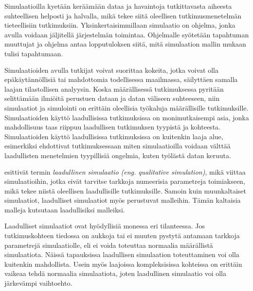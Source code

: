 \documentclass[utf8]{gradu3}
\begin{document}
Simulaatioilla kyetään keräämään dataa ja havaintoja tutkittavasta aiheesta suhteellisen helposti ja halvalla, mikä tekee siitä oleellisen tutkimusmenetelmän tieteellisiin tutkimuksiin. Yksinkertaisimmillaan simulaatio on ohjelma, jonka avulla voidaan jäljitellä järjestelmän toimintaa. Ohjelmalle syötetään tapahtuman muuttujat ja ohjelma antaa lopputuloksen siitä, mitä simulaation mallin mukaan tulisi tapahtumaan. 

Simulaatioiden avulla tutkijat voivat suorittaa kokeita, jotka voivat olla epäkäytännöllisiä tai mahdottomia todellisessa maailmassa, säilyttäen samalla laajan tilastollisen analyysin. Koska määrällisessä tutkimuksessa pyritään selittämään ilmiöitä perustuen dataan ja datan väliseen suhteeseen, niin simulaatiot ja simulointi on erittäin oleellisia työkaluja määrällisille tutkimuksille. 
Simulaatioiden käyttö laadullisissa tutkimuksissa on monimutkaisempi asia, 
jonka mahdollisuus taas riippuu laadullisen tutkimuksen tyypistä ja kohteesta. 
Simulaatioiden käyttö laadullisissa tutkimuksissa on kuitenkin laaja alue, 
esimerkiksi \textcite{eldabi2002quantitative} ehdottivat tutkimuksessaan miten simulaatioilla voidaan välttää laadullisten menetelmien tyypillisiä ongelmia, kuten työlästä datan keruuta. 

\textcite{kuipers1986qualitative} esittivät termin \textit{laadullinen simulaatio (eng. qualitative simulation)}, 
mikä viittaa simulaatioihin, jotka eivät tarvitse tarkkoja numeerisia parametreja toimiakseen, mikä tekee niistä oleellisen laadullisille tutkimuksille. 
Samoin kuin muunkaltaiset simulaatiot, laadulliset simulaatiot myös perustuvat malleihin.
Tämän kaltaisia malleja kutsutaan laadullisiksi malleiksi.

\begin{comment}
Näitä asioita ja piirteitä tulee tipoittain ja teksti alkaa tulla tavallaan toisteiseksi, joten johdannon logiikka kannattaa mietti: mitä, missä järjestyksessä ja mtä jätetään päälukuihin.
\end{comment}
Laadulliset simulaatiot ovat hyödyllisiä monessa eri tilanteessa. Jos tutkimuskohteen tiedossa on aukkoja tai ei muuten pystytä antamaan tarkkoja parametrejä simulaatiolle, eli ei voida toteuttaa normaalia määrällistä simulaatiota. Näissä tapauksissa laadullisen simulaation toteuttaminen voi olla kuitenkin mahdollista. Usein myös laajoissa kompleksisissa kohteissa on erittäin vaikeaa tehdä normaalia simulaatiota, joten laadullinen simulaatio voi olla järkevämpi vaihtoehto.
\end{document}
